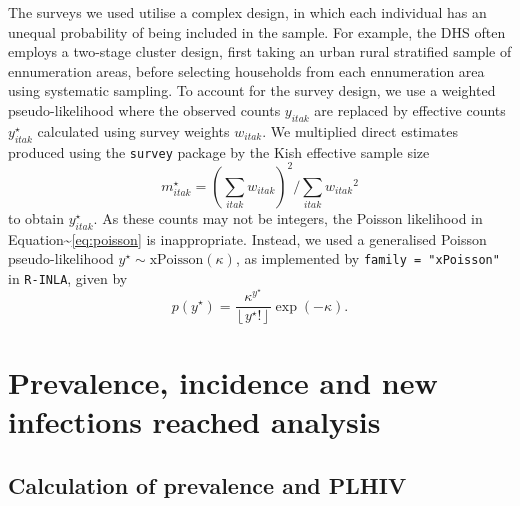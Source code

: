\documentclass[
]{article}
\begin{document}
The surveys we used utilise a complex design, in which each individual
has an unequal probability of being included in the sample. For example,
the DHS often employs a two-stage cluster design, first taking an urban
rural stratified sample of ennumeration areas, before selecting
households from each ennumeration area using systematic sampling. To
account for the survey design, we use a weighted pseudo-likelihood where
the observed counts \(y_{itak}\) are replaced by effective counts
\(y^\star_{itak}\) calculated using survey weights \(w_{itak}\). We
multiplied direct estimates produced using the \texttt{survey} package
\citep{JSSv009i08} by the Kish effective sample size
\citep{kish1965survey} \begin{equation}
    m^\star_{itak} = \left(\sum_{itak} w_{itak} \right)^2 / \sum_{itak} {w_{itak}}^2
\end{equation} to obtain \(y^\star_{itak}\). As these counts may not be
integers, the Poisson likelihood in
Equation\textasciitilde{}\eqref{eq:poisson} is inappropriate. Instead,
we used a generalised Poisson pseudo-likelihood
\(y^\star \sim \text{xPoisson}(\kappa)\), as implemented by
\texttt{family\ =\ "xPoisson"} in \texttt{R-INLA}, given by
\begin{equation}
    p(y^\star) = \frac{\kappa^{y^\star}}{\left \lfloor{y^\star!}\right \rfloor } \exp \left(- \kappa \right).
\end{equation}

\newpage

\hypertarget{prevalence-incidence-and-new-infections-reached-analysis}{%
\section{\texorpdfstring{Prevalence, incidence and new infections
reached analysis
\label{app:inc-inf}}{Prevalence, incidence and new infections reached analysis }}\label{prevalence-incidence-and-new-infections-reached-analysis}}

\hypertarget{calculation-of-prevalence-and-plhiv}{%
\subsection{Calculation of prevalence and
PLHIV}\label{calculation-of-prevalence-and-plhiv}}
\end{document}
